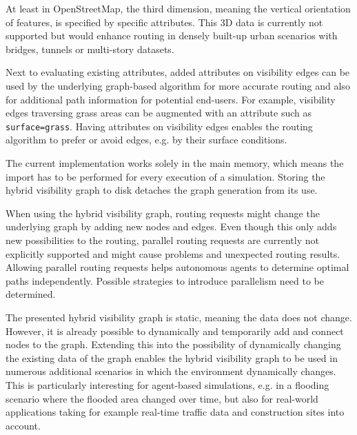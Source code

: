 		At least in OpenStreetMap, the third dimension, meaning the vertical orientation of features, is specified by specific attributes.
		This 3D data is currently not supported but would enhance routing in densely built-up urban scenarios with bridges, tunnels or multi-story datasets.
		
		Next to evaluating existing attributes, added attributes on visibility edges can be used by the underlying graph-based algorithm for more accurate routing and also for additional path information for potential end-users.
		For example, visibility edges traversing grass areas can be augmented with an attribute such as \texttt{surface=grass}.
		Having attributes on visibility edges enables the routing algorithm to prefer or avoid edges, e.g. by their surface conditions.
		
		The current implementation works solely in the main memory, which means the import has to be performed for every execution of a simulation.
		Storing the hybrid visibility graph to disk detaches the graph generation from its use.
		
		When using the hybrid visibility graph, routing requests might change the underlying graph by adding new nodes and edges.
		Even though this only adds new possibilities to the routing, parallel routing requests are currently not explicitly supported and might cause problems and unexpected routing results.
		Allowing parallel routing requests helps autonomous agents to determine optimal paths independently.
		Possible strategies to introduce parallelism need to be determined.
		
		The presented hybrid visibility graph is static, meaning the data does not change.
		However, it is already possible to dynamically and temporarily add and connect nodes to the graph.
		Extending this into the possibility of dynamically changing the existing data of the graph enables the hybrid visibility graph to be used in numerous additional scenarios in which the environment dynamically changes.
		This is particularly interesting for agent-based simulations, e.g. in a flooding scenario where the flooded area changed over time, but also for real-world applications taking for example real-time traffic data and construction sites into account.
		
